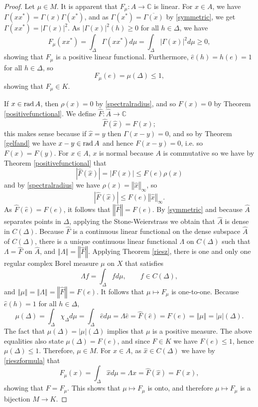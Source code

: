 \documentclass{article}
\newcommand{\rad}{\ensuremath\mathrm{rad}\,}
\newcommand{\norm}[1]{\left\Vert #1 \right\Vert}
\theoremstyle{definition}
\begin{document}
\begin{proof}
Let $\mu \in M$. It is apparent that $F_\mu:A \to \mathbb{C}$ is linear. For $x \in A$, we have $\Gamma(xx^*)=\Gamma(x)\Gamma(x^*)$, and as $\Gamma(x^*)=\overline{\Gamma(x)}$ by \eqref{symmetric}, we get
$\Gamma(xx^*)=|\Gamma(x)|^2$. As $|\Gamma(x)|^2(h) \geq 0$ for all $h \in \Delta$, we have
\[
F_\mu(xx^*) = \int_\Delta \Gamma(xx^*) d\mu = \int_\Delta |\Gamma(x)|^2 d\mu \geq 0,
\]
showing that $F_\mu$ is a positive linear functional. Furthermore, $\hat{e}(h)=h(e)=1$ for all $h \in \Delta$, so
\[
F_\mu(e)=\mu(\Delta) \leq 1,
\]
showing that $F_\mu \in K$.

If $x \in \rad A$, then $\rho(x)=0$ by \eqref{spectralradius}, and so $F(x)=0$ by Theorem \ref{positivefunctional}. We define $\widehat{F}:\widehat{A} \to \mathbb{C}$
\[
\widehat{F}(\hat{x})=F(x);
\]
this makes sense because if $\hat{x}=\hat{y}$ then $\Gamma(x-y)=0$, and so by Theorem \ref{gelfand} we have $x-y \in \rad A$ and hence $F(x-y)=0$, i.e.
so $F(x)=F(y)$. For $x \in A$, $x$ is normal because $A$ is commutative so we have by Theorem \ref{positivefunctional} that
\[
|\widehat{F}(\hat{x})| = |F(x)| \leq F(e)\rho(x)
\]
and by \eqref{spectralradius} we have $\rho(x)=\norm{\hat{x}}_\infty$, so 
\[
|\widehat{F}(\hat{x})| \leq F(e) \norm{\hat{x}}_\infty.
\]
As $\widehat{F}(\hat{e}) = F(e)$, it follows that $\norm{\widehat{F}}=F(e)$.
By \eqref{symmetric} and because $\widehat{A}$ separates points in $\Delta$,
applying the Stone-Weierstrass we obtain that $\widehat{A}$ is dense in $C(\Delta)$. 
Because $\widehat{F}$ is a continuous linear
functional on the dense subspace $\widehat{A}$ of $C(\Delta)$, there is a unique continuous linear functional
$\Lambda$ on $C(\Delta)$ such that 
$\Lambda=\widehat{F}$ on $\widehat{A}$, and $\norm{\Lambda}=\norm{\widehat{F}}$.
Applying Theorem \ref{riesz}, there is one and only one regular complex Borel measure $\mu$ on $X$ that satisfies
\begin{equation}
\Lambda f = \int_\Delta f d\mu, \qquad f \in C(\Delta),
\label{rieszformula}
\end{equation}
and $\norm{\mu}=\norm{\Lambda}=\norm{\widehat{F}}=F(e)$. It follows that $\mu \mapsto F_\mu$ is one-to-one. 
Because $\hat{e}(h)=1$ for all $h \in \Delta$,
\[
\mu(\Delta) = \int_\Delta \chi_\Delta d\mu = \int_\Delta \hat{e} d\mu = \Lambda \hat{e} = \widehat{F}(\hat{e}) = F(e) = \norm{\mu} = |\mu|(\Delta).
\]
The fact that $\mu(\Delta)=|\mu|(\Delta)$ implies that $\mu$ is a positive measure. The above equalities also state $\mu(\Delta)=F(e)$, and
since $F \in K$ we have $F(e) \leq 1$, hence $\mu(\Delta) \leq 1$. Therefore, $\mu \in M$. For $x \in A$, as $\hat{x} \in C(\Delta)$ we have
 by \eqref{rieszformula} that
\[
F_\mu(x) = \int_\Delta \hat{x} d\mu = \Lambda \hat{x} =\widehat{F}(\hat{x}) = F(x),
\]
showing that $F=F_\mu$. This shows that $\mu \mapsto F_\mu$ is onto, and therefore $\mu \mapsto F_\mu$ is a bijection
$M \to K$.
\end{proof}
\end{document}
